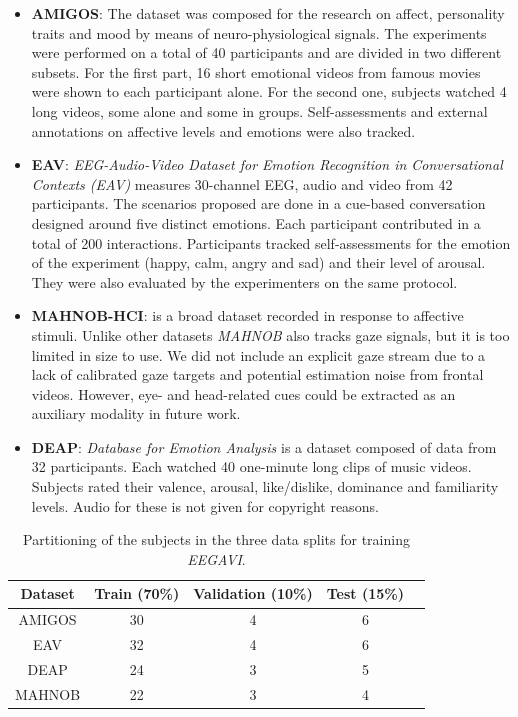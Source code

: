 \begin{itemize}
    \item \textbf{AMIGOS}: The dataset was composed for the research on affect, personality traits and mood by means of neuro-physiological signals.
    The experiments were performed on a total of 40 participants and are divided in two different subsets.
    For the first part, 16 short emotional videos from famous movies were shown to each participant alone.
    For the second one, subjects watched 4 long videos, some alone and some in groups.
    Self-assessments and external annotations on affective levels and emotions were also tracked.

    \item \textbf{EAV}\cite{article-eav}: \textit{EEG-Audio-Video Dataset for Emotion Recognition in Conversational Contexts (EAV)}
    measures 30-channel EEG, audio and video from 42 participants.
    The scenarios proposed are done in a cue-based conversation designed around five distinct emotions.
    Each participant contributed in a total of 200 interactions.
    Participants tracked self-assessments for the emotion of the experiment (happy, calm, angry and sad) and their level of arousal.
    They were also evaluated by the experimenters on the same protocol.

    \item \textbf{MAHNOB-HCI}\cite{5975141}: is a broad dataset recorded in response to affective stimuli.
    Unlike other datasets \textit{MAHNOB} also tracks gaze signals, but it is too limited in size to use.
    We did not include an explicit gaze stream due to a lack of calibrated gaze targets and potential estimation noise from frontal videos.
    However, eye- and head-related cues could be extracted as an auxiliary modality in future work.

    \item \textbf{DEAP}: \textit{Database for Emotion Analysis} is a dataset composed of data from 32 participants.
    Each watched 40 one-minute long clips of music videos.
    Subjects rated their valence, arousal, like/dislike, dominance and familiarity levels.
    Audio for these is not given for copyright reasons.

\end{itemize}


\begin{table}
    \centering
    \begin{tabular}{c | c | c | c | c}
        Dataset & Train (70\%) & Validation (10\%) & Test (15\%) \\
        \hline
        AMIGOS  & 30           & 4                 & 6           \\
        EAV     & 32           & 4                 & 6           \\
        DEAP    & 24           & 3                 & 5           \\
        MAHNOB  & 22           & 3                 & 4           \\
    \end{tabular}
    \caption{
        Partitioning of the subjects in the three data splits for training \textit{EEGAVI}.
    }
    \label{tab:datasetspartitoning}
\end{table}

